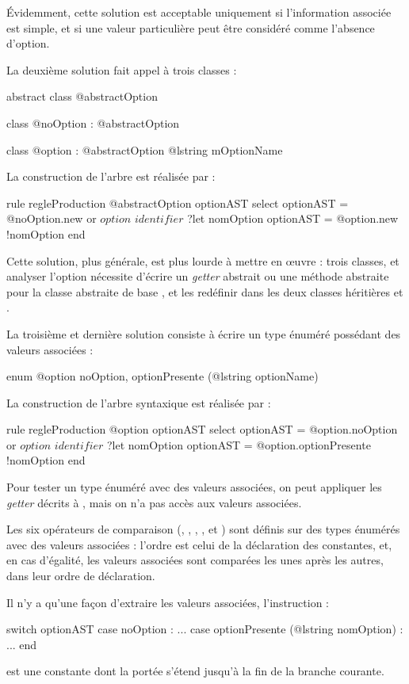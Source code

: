 Évidemment, cette solution est acceptable uniquement si l'information associée est simple, et si une valeur particulière peut être considéré comme l'absence d'option.

La deuxième solution fait appel à trois classes :
\begin{galgascode}
abstract class @abstractOption {}

class @noOption : @abstractOption {}

class @option : @abstractOption { @lstring mOptionName }
\end{galgascode}

La construction de l'arbre est réalisée par :
\begin{galgascode}
rule regleProduction {
  @abstractOption optionAST
  select
    optionAST = @noOption.new
  or
    $option$
    $identifier$ ?let nomOption
    optionAST = @option.new {!nomOption}
  end
}
\end{galgascode}

Cette solution, plus générale, est plus lourde à mettre en œuvre : trois classes, et analyser l'option nécessite d'écrire un \emph{getter} abstrait ou une méthode abstraite pour la classe abstraite de base , et les redéfinir dans les deux classes héritières  et .

La troisième et dernière solution consiste à écrire un type énuméré possédant des valeurs associées :

\begin{galgascode}
enum @option {
  noOption,
  optionPresente (@lstring optionName)
}
\end{galgascode}

La construction de l'arbre syntaxique est réalisée par :
\begin{galgascode}
rule regleProduction {
  @option optionAST
  select
    optionAST = @option.noOption
  or
    $option$
    $identifier$ ?let nomOption
    optionAST = @option.optionPresente {!nomOption}
  end
}
\end{galgascode}

Pour tester un type énuméré avec des valeurs associées, on peut appliquer les \emph{getter} décrits à , mais on n'a pas accès aux valeurs associées.

Les six opérateurs de comparaison (\galgas{==}, \galgas{\!=}, \galgas{<}, \galgas{<=}, \galgas{>} et \galgas{>}) sont définis sur des types énumérés avec des valeurs associées : l'ordre est celui de la déclaration des constantes, et, en cas d'égalité, les valeurs associées sont comparées les unes après les autres, dans leur ordre de déclaration.

Il n'y a qu'une façon d'extraire les valeurs associées, l'instruction  :

\begin{galgascode}
switch optionAST
case noOption : ...
case optionPresente (@lstring nomOption) : ...
end
\end{galgascode}

 est une constante dont la portée s'étend jusqu'à la fin de la branche  courante.
 
